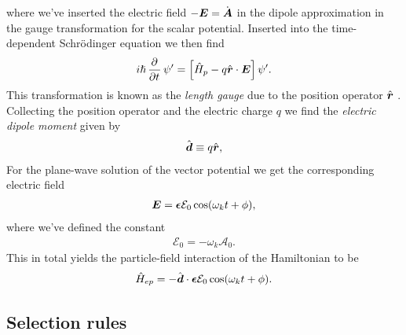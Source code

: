             where we've inserted the electric field $-\boldsymbol{E} = \dot{\boldsymbol{A}}$
            in the dipole approximation in the gauge transformation for the
            scalar potential.
            Inserted into the time-dependent Schrödinger equation we then find
            \begin{align}
                i\hslash\dpd{}{t}\psi'
                = \brak{
                    \hamil_p
                    - q\positionvec\cdot\vfg{E}
                }\psi'.
            \end{align}
            This transformation is known as the \emph{length gauge} due to the
            position operator $\hat{\boldsymbol{r}}$ \cite{joachain2012atoms}.
            Collecting the position operator and the electric charge $q$ we find
            the \emph{electric dipole moment} given by
            \begin{align}
                \hat{\boldsymbol{d}}
                \equiv
                q\hat{\boldsymbol{r}},
            \end{align}
            For the plane-wave solution of the vector potential we get the
            corresponding electric field
            \begin{align}
                \boldsymbol{E}
                = \boldsymbol{\epsilon}\mathcal{E}_0\cos(\omega_k t + \phi),
            \end{align}
            where we've defined the constant
            \begin{align}
                \mathcal{E}_0 = -\omega_k \mathcal{A}_0.
            \end{align}
            This in total yields the particle-field interaction of the
            Hamiltonian to be
            \begin{align}
                \hat{H}_{ep}
                = -\hat{\boldsymbol{d}}\cdot\boldsymbol{\epsilon}
                \mathcal{E}_0\cos(\omega_k t + \phi).
            \end{align}



        \subsection{Selection rules}

